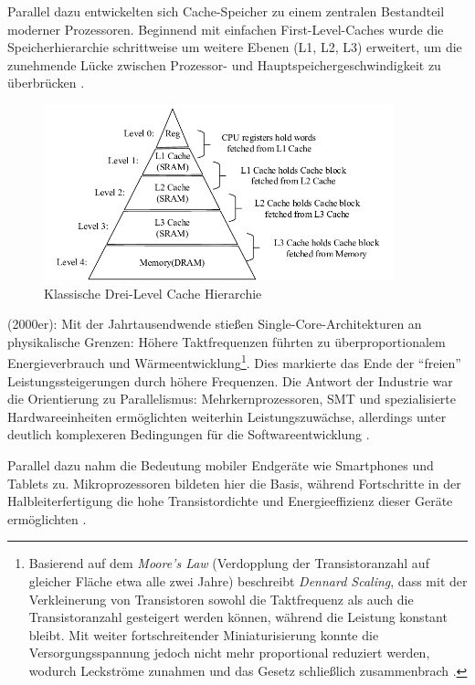 Parallel dazu entwickelten sich Cache-Speicher zu einem zentralen Bestandteil moderner Prozessoren. Beginnend mit einfachen First-Level-Caches wurde die Speicherhierarchie schrittweise um weitere Ebenen (L1, L2, L3) erweitert, um die zunehmende Lücke zwischen Prozessor- und Hauptspeichergeschwindigkeit zu überbrücken \parencite[S.~2]{hennessy_computer_2011}.

\begin{figure}[htbp]
    \centering
    \includegraphics[width=0.90\textwidth]{img/Cache-Hierarchie.png}
    \caption{Klassische Drei-Level Cache Hierarchie 	\cite{gao_cspm_2022}}
    \label{fig:cache_hierarchie}
\end{figure}

(2000er): Mit der Jahrtausendwende stießen Single-Core-Architekturen an physikalische Grenzen: Höhere Taktfrequenzen führten zu überproportionalem Energieverbrauch und Wärmeentwicklung\footnote{Basierend auf dem \textit{Moore’s Law} (Verdopplung der Transistoranzahl auf gleicher Fläche etwa alle zwei Jahre) beschreibt \textit{Dennard Scaling}, dass mit der Verkleinerung von Transistoren sowohl die Taktfrequenz als auch die Transistoranzahl gesteigert werden können, während die Leistung konstant bleibt. Mit weiter fortschreitender Miniaturisierung konnte die Versorgungsspannung jedoch nicht mehr proportional reduziert werden, wodurch Leckströme zunahmen und das Gesetz schließlich zusammenbrach \cite{hennessy_new_2019}.}. Dies markierte das Ende der \enquote{freien} Leistungssteigerungen durch höhere Frequenzen. Die Antwort der Industrie war die Orientierung zu Parallelismus: Mehrkernprozessoren, \ac{SMT} und spezialisierte Hardwareeinheiten ermöglichten weiterhin Leistungszuwächse, allerdings unter deutlich komplexeren Bedingungen für die Softwareentwicklung \parencites[S.~3f]{shalf_new_2007}[S.~67f]{parkhurst_single_2006}.

Parallel dazu nahm die Bedeutung mobiler Endgeräte wie Smartphones und Tablets zu. Mikroprozessoren bildeten hier die Basis, während Fortschritte in der Halbleiterfertigung die hohe Transistordichte und Energieeffizienz dieser Geräte ermöglichten \parencite[S.~2]{hennessy_computer_2011}.

